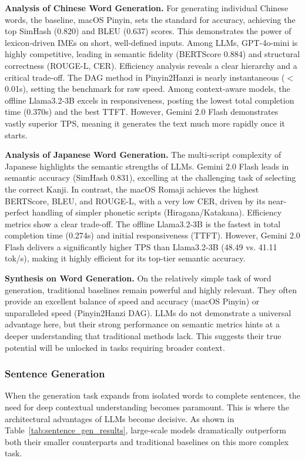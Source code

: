 \documentclass[10pt, a4paper]{article}
\begin{document}
\textbf{Analysis of Chinese Word Generation.}
For generating individual Chinese words, the baseline, macOS Pinyin, sets the standard for accuracy, achieving the top SimHash (0.820) and BLEU (0.637) scores. This demonstrates the power of lexicon-driven IMEs on short, well-defined inputs. Among LLMs, GPT-4o-mini is highly competitive, leading in semantic fidelity (BERTScore 0.884) and structural correctness (ROUGE-L, CER). Efficiency analysis reveals a clear hierarchy and a critical trade-off. The DAG method in Pinyin2Hanzi is nearly instantaneous ($<$0.01s), setting the benchmark for raw speed. Among context-aware models, the offline Llama3.2-3B excels in responsiveness, posting the lowest total completion time (0.370s) and the best TTFT. However, Gemini 2.0 Flash demonstrates vastly superior TPS, meaning it generates the text much more rapidly once it starts. 


\textbf{Analysis of Japanese Word Generation.}
The multi-script complexity of Japanese highlights the semantic strengths of LLMs. {Gemini 2.0 Flash} leads in semantic accuracy (SimHash 0.831), excelling at the challenging task of selecting the correct Kanji. In contrast, the {macOS Romaji} achieves the highest BERTScore, BLEU, and ROUGE-L, with a very low CER, driven by its near-perfect handling of simpler phonetic scripts (Hiragana/Katakana).
Efficiency metrics show a clear trade-off. The offline {Llama3.2-3B} is the fastest in total completion time (0.274s) and initial responsiveness (TTFT). However, {Gemini 2.0 Flash} delivers a significantly higher TPS than Llama3.2-3B (48.49 vs. 41.11 tok/s), making it highly efficient for its top-tier semantic accuracy.

\textbf{Synthesis on Word Generation.}
On the relatively simple task of word generation, traditional baselines remain powerful and highly relevant. They often provide an excellent balance of speed and accuracy (macOS Pinyin) or unparalleled speed (Pinyin2Hanzi DAG). LLMs do not demonstrate a universal advantage here, but their strong performance on semantic metrics hints at a deeper understanding that traditional methods lack. This suggests their true potential will be unlocked in tasks requiring broader context.

\subsubsection{Sentence Generation}

When the generation task expands from isolated words to complete sentences, the need for deep contextual understanding becomes paramount. This is where the architectural advantages of LLMs become decisive. As shown in Table~\ref{tab:sentence_gen_results}, large-scale models dramatically outperform both their smaller counterparts and traditional baselines on this more complex task.
\end{document}
